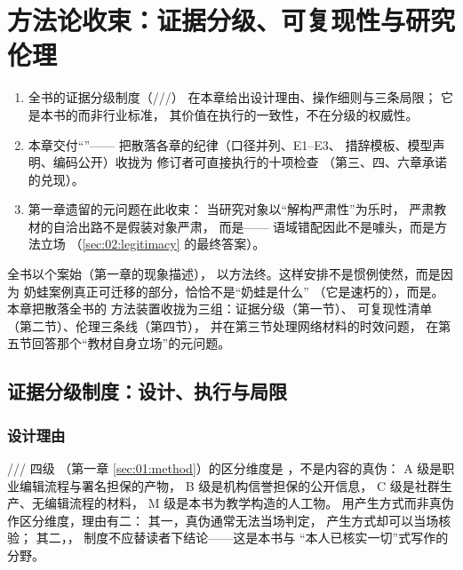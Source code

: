 \chapter{方法论收束：证据分级、可复现性与研究伦理}\label{ch:12}

\begin{nlkeypoints}
  \begin{enumerate}[label=(\arabic*),leftmargin=2.4em]
    \item 全书的证据分级制度（///）
          在本章给出设计理由、操作细则与三条局限；
          它是本书的而非行业标准，
          其价值在执行的一致性，不在分级的权威性。
    \item 本章交付“”——
          把散落各章的纪律（口径并列、E1--E3、
          措辞模板、模型声明、编码公开）收拢为
          修订者可直接执行的十项检查
          （第三、四、六章承诺的兑现）。
    \item 第一章遗留的元问题在此收束：
          当研究对象以“解构严肃性”为乐时，
          严肃教材的自洽出路不是假装对象严肃，
          而是——
          语域错配因此不是噱头，而是方法立场
          （\ref{sec:02:legitimacy} 的最终答案）。
  \end{enumerate}
\end{nlkeypoints}

全书以个案始（第一章的现象描述），
以方法终。这样安排不是惯例使然，而是因为
奶蛙案例真正可迁移的部分，恰恰不是“奶蛙是什么”
（它是速朽的），而是。本章把散落全书的
方法装置收拢为三组：证据分级（第一节）、
可复现性清单（第二节）、伦理三条线（第四节），
并在第三节处理网络材料的时效问题，
在第五节回答那个“教材自身立场”的元问题。

\section{证据分级制度：设计、执行与局限}\label{sec:12:grades}

\subsection{设计理由}

/// 四级
（第一章 \ref{sec:01:method}）的区分维度是
，不是内容的真伪：
A 级是职业编辑流程与署名担保的产物，
B 级是机构信誉担保的公开信息，
C 级是社群生产、无编辑流程的材料，
M 级是本书为教学构造的人工物。
用产生方式而非真伪作区分维度，理由有二：
其一，真伪通常无法当场判定，
产生方式却可以当场核验；
其二，，
制度不应替读者下结论——这是本书与
“本人已核实一切”式写作的分野。

